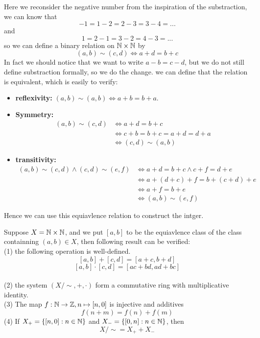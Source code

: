 \documentclass[en,geye,blue,normal,12pt]{elegantnote}
\begin{document}
Here we reconsider the negative number from the inspiration of the substraction, we can know that
\[-1 = 1-2 = 2-3 = 3-4 = ...\]
and 
\[1 = 2-1 = 3-2 = 4-3 = ...\]
so we can define a binary relation on \(\mathbb{N} \times \mathbb{N}\) by 
\[(a,b) \sim (c,d) \Longleftrightarrow a+d = b+c\]
In fact we should notice that we want to write \(a-b =c-d\), but we do not still define substraction formally, so we do the change. we can define that the relation is equivalent, which is easily to verify:
\begin{itemize}
    \item \textbf{reflexivity:} \((a,b) \sim (a,b) \Longleftrightarrow a+b = b+a\).
    \item \textbf{Symmetry:} \[
\begin{array}{rl}
  (a, b) \sim (c, d) & \iff a + d = b + c  \\
&\iff c+b = b+c = a+d = d+a \\ 
&\iff (c,d) \sim (a,b) \end{array}
\]
    \item \textbf{transitivity:}
    \[\begin{array}{rl}
        (a, b) \sim (c, d) \wedge (c,d) \sim (e,f) & \iff a + d = b + c \wedge c+f =d+e \\
      &\iff a+(d+c)+f = b+(c+d)+e\\ 
      &\iff a+f = b+e \\
      &\iff (a,b) \sim (e,f) \end{array}
      \]
\end{itemize}

Hence we can use this equiavlence relation to construct the intger.
\begin{proposition}
    Suppose \(X = \mathbb{N} \times \mathbb{N}\), and we put \([a,b]\) to be the equiavlence class of the class containning \((a,b) \in X\), then following result can be verified:
    \\(1) the following operation is well-defined.
    \[[a,b]+[c,d] = [a+c,b+d]\]
    \[[a,b]\cdot[c,d] = [ac+bd, ad+bc]\]
    \\(2) the system \((X/\sim,+,\cdot)\) form a commutative ring with multiplicative identity.
    \\(3) The map \(f: \mathbb{N} \to \mathbb{Z}, n \mapsto [n,0]\) is injective and additives   
    \begin{equation*}
      f(n+m) = f(n) + f(m)
    \end{equation*}
    (4) If \(X_+ = \{[n,0]: n\in \mathbb{N}\}\) and \(X_- = \{[0,n]: n\in \mathbb{N}\}\), then
    \[X/\sim = X_+ + X_-\]
\end{proposition}
\end{document}

